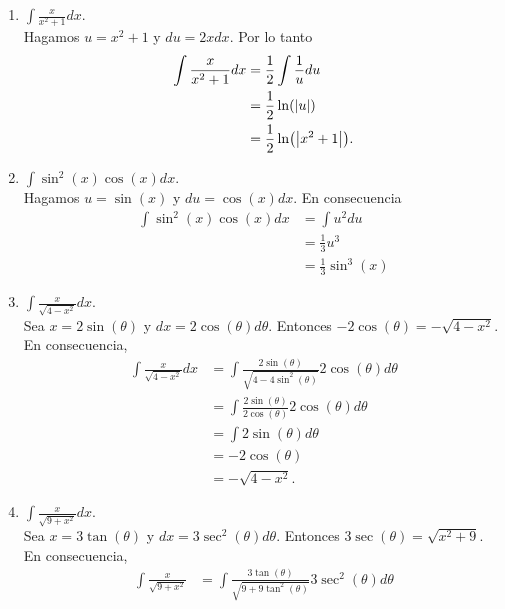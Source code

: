 \documentclass[12pt,a4paper]{article}
\begin{document}
    \begin{solucion}
        \begin{enumerate}
            \item[(a)] $\displaystyle\int\frac{x}{x^{2}+1}dx$.\\
            Hagamos $u=x^{2}+1$ y $du=2xdx$. Por lo tanto
            \begin{align*}
                \int\frac{x}{x^{2}+1}dx&=\frac{1}{2}\int\frac{1}{u}du\\
                &=\frac{1}{2}\ln(\abs{u})\\
                &=\frac{1}{2}\ln(\abs{x^{2}+1}).
            \end{align*}
            \item[(b)] $\displaystyle\int\sin^{2}(x)\cos(x)dx$.\\
            Hagamos $u=\sin(x)$ y $du=\cos(x)dx$. En consecuencia
            \begin{align*}
                \int\sin^{2}(x)\cos(x)dx&=\int u^{2}du\\
                &=\frac{1}{3}u^{3}\\
                &=\frac{1}{3}\sin^{3}(x)
            \end{align*}
            \item[(c)] $\displaystyle\int\frac{x}{\sqrt{4-x^{2}}}dx$.\\
            Sea $x=2\sin(\theta)$ y $dx=2\cos(\theta)d\theta$. Entonces $-2\cos(\theta)=-\sqrt{4-x^{2}}$. En
            consecuencia,
            \begin{align*}
                \int\frac{x}{\sqrt{4-x^{2}}}dx&=\int\frac{2\sin(\theta)}{\sqrt{4-4\sin^{2}(\theta)}}2\cos(\theta)d\theta\\
                &=\int\frac{2\sin(\theta)}{2\cos(\theta)}2\cos(\theta)d\theta\\
                &=\int2\sin(\theta)d\theta\\
                &=-2\cos(\theta)\\
                &=-\sqrt{4-x^{2}}.
            \end{align*}
            \item[(d)] $\displaystyle\int\frac{x}{\sqrt{9+x^{2}}}dx$.\\
            Sea $x=3\tan(\theta)$ y $dx=3\sec^{2}(\theta)d\theta$. Entonces $3\sec(\theta)=\sqrt{x^{2}+9}$. En consecuencia,
            \begin{align*}
                \int\frac{x}{\sqrt{9+x^{2}}}&=\int\frac{3\tan(\theta)}{\sqrt{9+9\tan^{2}(\theta)}}3\sec^{2}(\theta)d\theta\\

\end{align*}
\end{enumerate}
\end{solucion}
\end{document}
